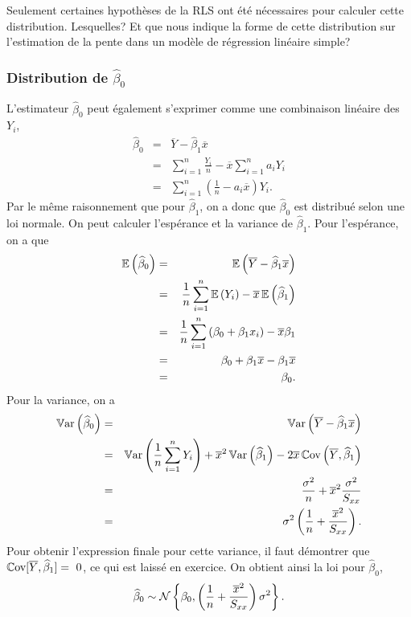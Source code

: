 \begin{remarque}
Seulement certaines hypothèses de la RLS ont été nécessaires pour calculer cette distribution. Lesquelles? Et que nous indique la forme de cette distribution sur l'estimation de la pente dans un modèle de régression linéaire simple?
\end{remarque}


\subsubsection{Distribution de $\widehat\beta_0$}
\label{DistributionBeta0}
L'estimateur $\widehat\beta_0$ peut également s'exprimer comme une combinaison linéaire des $Y_i$,
\begin{eqnarray*}
 \widehat{\beta}_0 &=& \overline{Y} - \widehat{\beta}_1 \overline{x} \\
 &=& \sum_{i=1}^n \frac{Y_i}{n} - \overline{x} \sum_{i=1}^n a_i Y_i \\
 &=& \sum_{i=1}^n \left( \frac{1}{n} - a_i \overline{x}\right) Y_i.
\end{eqnarray*}
Par le même raisonnement que pour $\widehat\beta_1$, on a donc que $\widehat\beta_0$ est distribué selon une loi normale. On peut calculer l'espérance et la variance de $\widehat\beta_1$. Pour l'espérance, on a que
\begin{eqnarray*}
 \mathbb{E}\left(\widehat{\beta}_0\right) &=& \mathbb{E}\left(\overline{Y} - \widehat{\beta}_1 \overline{x}\right) \\
 &=& \frac{1}{n}\sum_{i=1}^n \mathbb{E}\left(Y_i\right) - \overline{x}  \,\mathbb{E}\left(\widehat{\beta}_1\right)  \\
 &=& \frac{1}{n}\sum_{i=1}^n\left(\beta_0+\beta_1 x_i\right)-\overline{x}\beta_1 \\
 & = & \beta_0+\beta_1 \overline x-\beta_1\overline x \\
 & = & \beta_0.
\end{eqnarray*}
Pour la variance, on a
\begin{eqnarray*}
 \mathbb{V}\text{ar}\left(\widehat{\beta}_0\right) &=& \mathbb{V}\text{ar}\left(\overline{Y} - \widehat{\beta}_1 \overline{x}\right) \\
 &=& \mathbb{V}\text{ar}\left(\frac{1}{n}\sum_{i=1}^n Y_i\right)+ \overline{x}^2 \, \mathbb{V}\text{ar}\left(\widehat{\beta}_1\right)-2\overline x \, \mathbb{C}\text{ov}\left(\overline Y,\widehat\beta_1\right)  \\
 &=& \frac{\sigma^2}{n}+\overline{x}^2\frac{\sigma^2}{S_{xx}} \\
 & = & \sigma^2\left(\frac{1}{n}+\frac{\overline{x}^2}{S_{xx}}\right).
\end{eqnarray*}
Pour obtenir l'expression finale pour cette variance, il faut démontrer que $\mathbb{C}\text{ov}[\overline Y,\widehat\beta_1]=~0$, ce qui est laissé en exercice. 
On obtient ainsi la loi pour $\widehat\beta_0$,
\begin{eqnarray}
\label{distbeta0}
 \widehat{\beta}_0 \sim \mathcal{N}\left\{\beta_0, \left(\frac{1}{n}+\frac{\overline{x}^2}{S_{xx}}\right)\sigma^2\right\}.
\label{loibeta0}
\end{eqnarray}

